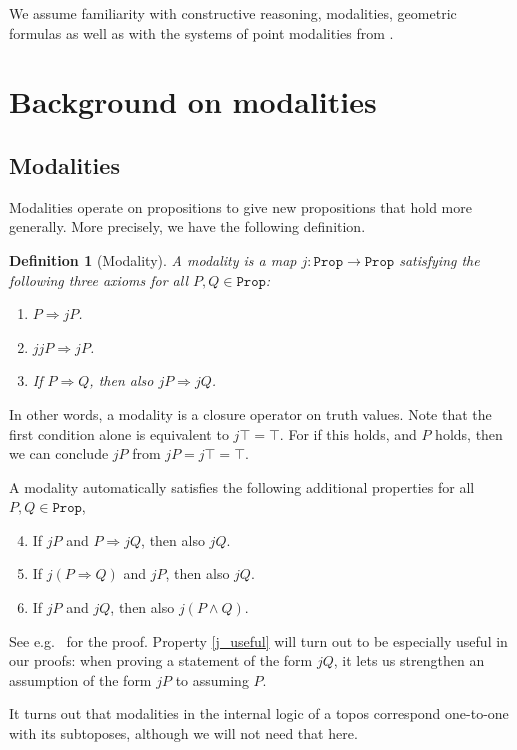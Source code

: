 \documentclass[reqno,11pt]{amsproc}
\theoremstyle{plain}
\newtheorem{definition}[theorem]{Definition}
\theoremstyle{definition}
\newcommand{\Const}[1]{\mathtt{#1}}
\renewcommand{\to}[1][]{\xrightarrow{#1}}
\newcommand{\prop}{\Const{Prop}}
\newcommand{\imp}{\Rightarrow}
\numberwithin{equation}{section}
\begin{document}
We assume familiarity with constructive reasoning, modalities, geometric formulas as well as with the systems of point modalities from .

\section{Background on modalities}

\subsection{Modalities}

Modalities operate on propositions to give new propositions that hold more generally. More precisely, we have the following definition. 

\begin{definition}[Modality]
	\label{def.modality}
	A \emph{modality} is a map $j \colon \prop \to \prop$ satisfying the following three axioms for all $P,Q \in \prop$:
	\begin{enumerate}
		\item $P\imp jP$.
		\item $jjP \imp jP$.
  		\item If $P \imp Q$, then also $jP \imp jQ$.
	\end{enumerate}
\end{definition}

In other words, a modality is a closure operator on truth values. Note that the first condition alone is equivalent to $j\top = \top$. For if this holds, and $P$ holds, then we can conclude $jP$ from $jP = j\top = \top$.

A modality automatically satisfies the following additional properties for all $P,Q \in \prop$,
\begin{enumerate}
	\setcounter{enumi}{3}	%
	\item\label{j_useful} If $jP$ and $P\imp jQ$, then also $jQ$.
	\item If $j(P\imp Q)$ and $jP$, then also $jQ$.
	\item If $jP$ and $jQ$, then also $j(P\land Q)$.
\end{enumerate}
See e.g.~\cite[Lemma~4.6]{schultz2019temporal} for the proof. Property \ref{j_useful} will turn out to be especially useful in our proofs: when proving a statement of the form $jQ$, it lets us strengthen an assumption of the form $jP$ to assuming $P$.

It turns out that modalities in the internal logic of a topos correspond one-to-one with its subtoposes, although we will not need that here.
\end{document}
